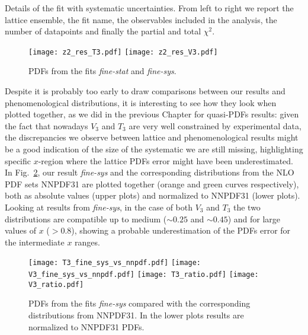 \begin{table}[t]
    \renewcommand*{\arraystretch}{1.60}
    \scriptsize
    \centering
    
    \vspace{0.3cm}
    \caption{Details of the fit with systematic uncertainties. 
	From left to right we report the lattice ensemble, the fit name, 
	the observables included in the analysis, the number of datapoints and finally
	the partial and total $\chi^2$.}
    \label{tab:chi2_sys}
\end{table}
    
\begin{figure}[h!]
    \center
    \texttt{[image: z2\_res\_T3.pdf]}
    \texttt{[image: z2\_res\_V3.pdf]}
    \caption{PDFs from the fits \textit{fine-stat} and \textit{fine-sys}.}
    \label{fig::fits_z2}
\end{figure}

%
Despite it is probably too early to draw comparisons between our results and phenomenological distributions, 
it is interesting to see how they look when plotted together, as we did in the previous Chapter for
quasi-PDFs results: given the fact that nowadays $V_3$ and $T_3$ are
very well constrained by experimental data, the discrepancies we observe between lattice and phenomenological results
might be a good indication of the size of the systematic we are still missing, highlighting specific $x$-region
where the lattice PDFs error might have been underestimated. 
In Fig.~\ref{fig::fits_ratio},
our result \textit{fine-sys} and the corresponding distributions from the NLO PDF sets
NNPDF31 \cite{Ball:2017nwa} are plotted together (orange and green curves respectively), both as
absolute values (upper plots) and normalized to NNPDF31 (lower plots). 
Looking at results from \textit{fine-sys}, in the case of both $V_3$ and $T_3$ the two distributions are compatible 
up to medium ($\sim 0.25$ and $\sim 0.45 $)
and for large values of $x$ ($ >0.8$), showing a probable underestimation of the PDFs error for the intermediate $x$ ranges. 
\begin{figure}[h!]
    \center
    \texttt{[image: T3\_fine\_sys\_vs\_nnpdf.pdf]}
    \texttt{[image: V3\_fine\_sys\_vs\_nnpdf.pdf]}
    \texttt{[image: T3\_ratio.pdf]}
    \texttt{[image: V3\_ratio.pdf]}
    \caption{PDFs from the fits \textit{fine-sys} compared with the corresponding distributions from NNPDF31. 
    In the lower plots results are normalized to NNPDF31 PDFs.}
    \label{fig::fits_ratio}
\end{figure}


